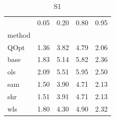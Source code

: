 \begin{table}
\caption{S1}
\label{ }
\begin{tabular}{lrrrr}
\toprule
 & 0.05 & 0.20 & 0.80 & 0.95 \\
method &  &  &  &  \\
\midrule
QOpt & 1.36 & 3.82 & 4.79 & 2.06 \\
base & 1.83 & 5.14 & 5.82 & 2.36 \\
ols & 2.09 & 5.51 & 5.95 & 2.50 \\
sam & 1.50 & 3.90 & 4.71 & 2.13 \\
shr & 1.51 & 3.91 & 4.71 & 2.13 \\
wls & 1.80 & 4.30 & 4.90 & 2.32 \\
\bottomrule
\end{tabular}
\end{table}
